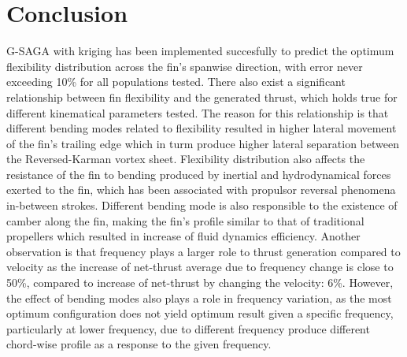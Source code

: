 \section{Conclusion}
G-SAGA with kriging has been implemented succesfully to predict the optimum flexibility distribution across the fin's spanwise direction, with error never exceeding 10\% for all populations tested. There also exist a significant relationship between fin flexibility and the generated thrust, which holds true for different kinematical parameters tested. The reason for this relationship is that different bending modes related to flexibility resulted in higher lateral movement of the fin's trailing edge which in turm produce higher lateral separation between the Reversed-Karman vortex sheet. Flexibility distribution also affects the resistance of the fin to bending produced by inertial and hydrodynamical forces exerted to the fin, which has been associated with propulsor reversal phenomena in-between strokes. Different bending mode is also responsible to the existence of camber along the fin, making the fin's profile similar to that of traditional propellers which resulted in increase of fluid dynamics efficiency. Another observation is that frequency plays a larger role to thrust generation compared to velocity as the increase of net-thrust average due to frequency change is close to 50\%, compared to increase of net-thrust by changing the velocity: 6\%. However, the effect of bending modes also plays a role in frequency variation, as the most optimum configuration does not yield optimum result given a specific frequency, particularly at lower frequency, due to different frequency produce different chord-wise profile as a response to the given frequency. 
